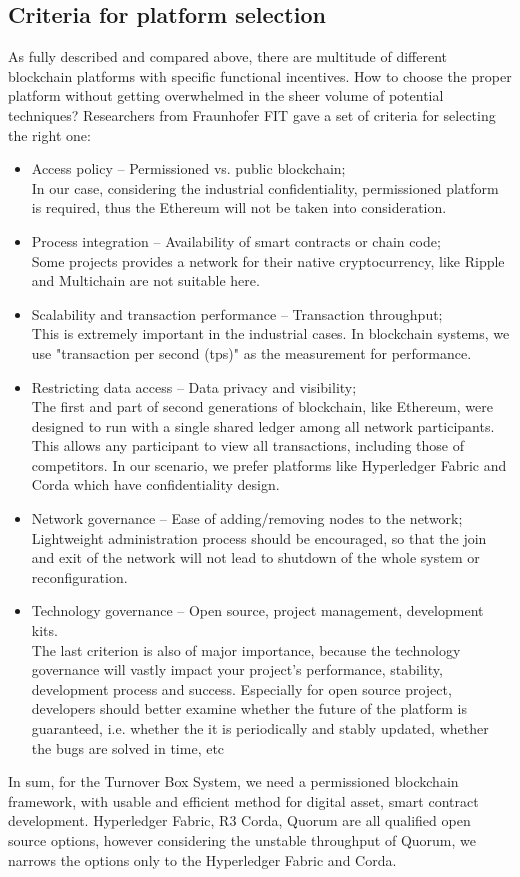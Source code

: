 \subsection{Criteria for platform selection}
As fully described and compared above, there are multitude of different blockchain platforms with specific functional incentives. How to choose the proper platform without getting overwhelmed in the sheer volume of potential techniques? Researchers from Fraunhofer FIT gave a set of criteria\cite{fraunhofer} for selecting the right one:
\begin{itemize}
	\item Access policy – Permissioned vs. public blockchain;\\
	In our case, considering the industrial confidentiality, permissioned platform is required, thus the Ethereum will not be taken into consideration.
	\item Process integration – Availability of smart contracts or
	chain code;\\
	Some projects provides a network for their native cryptocurrency, like Ripple and Multichain are not suitable here.  
	\item Scalability and transaction performance – Transaction
	throughput;\\
	This is extremely important in the industrial cases. In blockchain systems, we use "transaction per second (tps)" as the measurement for performance.
	\item Restricting data access – Data privacy and visibility;\\
	The first and part of second generations of blockchain, like Ethereum, were designed to run with a single shared ledger among all network participants. This allows any participant to view all transactions, including those of competitors. In our scenario,  we prefer platforms like Hyperledger Fabric and Corda which have confidentiality design.
	\item Network governance – Ease of adding/removing nodes
	to the network;\\
	Lightweight administration process should be encouraged, so that the join and exit of the network will not lead to shutdown of the whole system or reconfiguration.
	\item Technology governance – Open source, project
	management, development kits.\\
	The last criterion is also of major importance, because the technology governance will vastly impact your project's performance, stability, development process and success. Especially for open source project, 
	developers should better examine whether the future of the platform is guaranteed, i.e. whether the it is periodically and stably updated, whether the bugs are solved in time, etc

\end{itemize}
In sum, for the Turnover Box System, we need a permissioned blockchain framework, with usable and efficient method for digital asset, smart contract development. Hyperledger Fabric, R3 Corda, Quorum are all qualified open source options, however considering the unstable throughput of Quorum, we narrows the options only to the Hyperledger Fabric and Corda.

